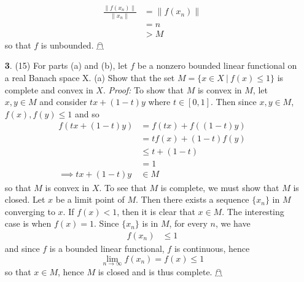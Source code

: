 \documentclass{article}
\begin{document}
\begin{itemize}
    \begin{align*}
        \frac{\|f(x_n)\|}{\|x_n\|} &= \|f(x_n)\|\\
        &= n\\
        &> M
    \end{align*}
    so that $f$ is unbounded. \hfill $\mathghost$
    \pagebreak
    \item[\textbf{3}.] (15) For parts (a) and (b), let $f$ be a nonzero bounded linear functional on a real Banach space X.
    \newline
    (a) Show that the set $M = \{x \in X \: | \: f(x) \leq 1\}$ is complete and convex in $X$. 
    \newline\newline
    \textit{Proof:} To show that $M$ is convex in $M$, let $x,y \in M$ and consider $tx + (1 - t)y$ where $t \in [0,1]$. Then since $x,y \in M$, $f(x), f(y) \leq 1$ and so
    \begin{align*}
        f(tx + (1 - t)y) &= f(tx) + f((1-t)y)\\
        &= tf(x) + (1-t)f(y)\\
        &\leq t + (1-t)\\
        &= 1\\
        \implies tx + (1 - t)y &\in M
    \end{align*}
    so that $M$ is convex in $X$. To see that $M$ is complete, we must show that $M$ is closed. Let $x$ be a limit point of $M$. Then there exists a sequence $\{x_n\}$ in $M$ converging to $x$. If $f(x) < 1$, then it is clear that $x \in M$. The interesting case is when $f(x) = 1$. Since $\{x_n\}$ is in $M$, for every $n$, we have
    \begin{align*}
        f(x_n) &\leq 1
    \end{align*}
    and since $f$ is a bounded linear functional, $f$ is continuous, hence
    \[\lim_{n \to \infty} f(x_n) = f(x) \leq 1\]
    so that $x \in M$, hence $M$ is closed and is thus complete. \hfill $\mathghost$
    

\end{itemize}
\end{document}
